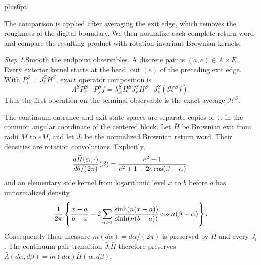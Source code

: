 \documentclass[12pt,reqno]{amsart}
\makeatletter
\theoremstyle{plain}
\theoremstyle{definition}
\theoremstyle{remark}
\renewenvironment{proof}[1][\proofname]{%
  \par
  \pushQED{\qed}%
  \normalfont
  \topsep6pt plus6pt\relax
  \trivlist
  \item[\hskip\labelsep\slshape #1\@addpunct{.}]%
  \ignorespaces
}{%
  \popQED
  \endtrivlist
  \@endpefalse
}
\DeclareRobustCommand{\qed}{%
  \leavevmode\unskip\penalty9999\hbox{}\nobreak
  \ifmmode
    \makebox[0pt][l]{\qquad\hbox{\qedsymbol}}%
  \else
    \qquad\hbox{\qedsymbol}%
  \fi
}
\renewcommand{\qedsymbol}{\rule[.47pt]{4pt}{6pt}}
\numberwithin{equation}{section}
\makeatother
\begin{document}
\begin{proof}[Proof of Lemma~\ref{lem:typed-centered-endpoint-product}]
The comparison is applied after averaging the exit edge, which removes the
roughness of the digital boundary. We then normalize each complete return
word and compare the resulting product with rotation-invariant Brownian
kernels.

\smallskip\noindent
\underline{\textit{Step 1.}}\quad Smooth the endpoint observables.
A discrete pair is
\((a,e)\in A\times E\).  Every exterior kernel starts at the head
\(\operatorname{out}(e)\) of the preceding exit edge.  With
\(P_i^S=J_i^SH^S\), exact operator composition is
\begin{equation}
 \Lambda^SP_r^S\cdots P_s^Sf
 =\lambda_A^SH^SJ_r^SH^S\cdots J_s^S(\mathcal{H}^Sf).         \label{eq:tu-TP3}
\end{equation}
Thus the first operation on the terminal observable is the exact average
\(\mathcal{H}^S\).

The continuum entrance and exit state spaces are separate copies of
\(\mathbb T\), in the common angular coordinate of the centered block.
Let \(\bar H\) be Brownian exit from radii \(M\) to \(eM\), and let
\(\bar J_i\) be the normalized Brownian return word.  Their densities are
rotation convolutions.  Explicitly,
\begin{equation}
 {d\bar H(\alpha,\cdot)\over d\theta/(2\pi)}(\beta)
 ={e^2-1\over e^2+1-2e\cos(\beta-\alpha)},                \label{eq:tu-TP4}
\end{equation}
and an elementary side kernel from logarithmic level \(x\) to \(b\) before
\(a\) has unnormalized density
\begin{equation}
 {1\over2\pi}\left\{{x-a\over b-a}
 +2\sum_{n\ge1}{\sinh(n(x-a))\over\sinh(n(b-a))}
       \cos n(\beta-\alpha)\right\}.                      \label{eq:tu-TP5}
\end{equation}
Consequently Haar measure \(m(d\alpha)=d\alpha/(2\pi)\) is preserved
by \(\bar H\) and every \(\bar J_i\). The continuum pair transition
\(\bar J_i\bar H\) therefore preserves
\(\bar\Lambda(d\alpha,d\beta)=m(d\alpha)\bar H(\alpha,d\beta)\).


\end{proof}
\end{document}
